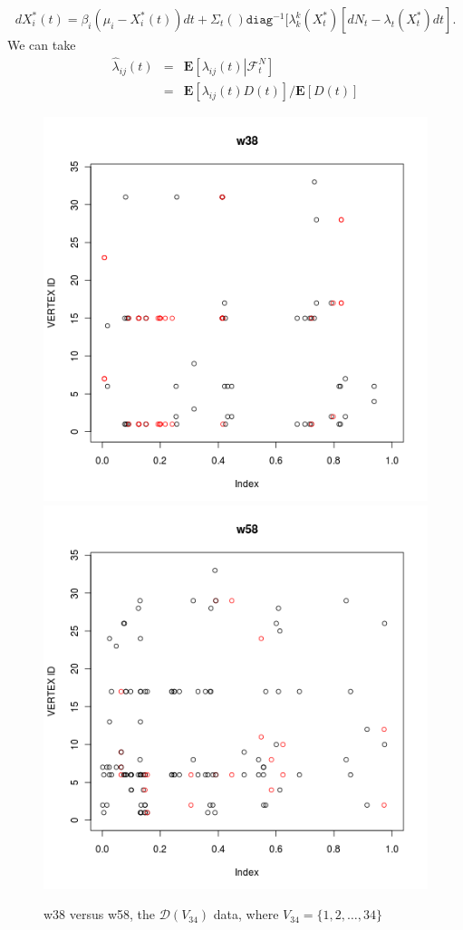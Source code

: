\documentclass[12pt]{article}%
\begin{document}
\begin{eqnarray}
dX_i^*(t) = 
\beta_i (\mu_i - X_i^*(t)) dt  
+
\Sigma_{t} () \texttt{diag}^{-1}[\lambda_k^k(X_t^*) [dN_t - \lambda_t(X_t^*)dt].
\end{eqnarray}
We can take
\begin{eqnarray}
\widehat{\lambda}_{ij}(t) 
&=& \mathbf E\left[ \lambda_{ij}(t) \left| \mathcal F^{N}_t\right.\right] \\
&=& \mathbf E\left[ \lambda_{ij}(t) D(t)\right]/\mathbf E\left[D(t)\right]
\end{eqnarray}
\begin{figure}
\begin{center}
\includegraphics[scale=0.30]{v34_myDdata_w38.png}
\includegraphics[scale=0.30]{v34_myDdata_w58.png}
\end{center}
\caption{w38 versus w58, the $\mathcal D(V_{34})$ data, where $V_{34} =\{1,2,\ldots, 34\}$}
\label{theDplot}
\end{figure}
\end{document}
